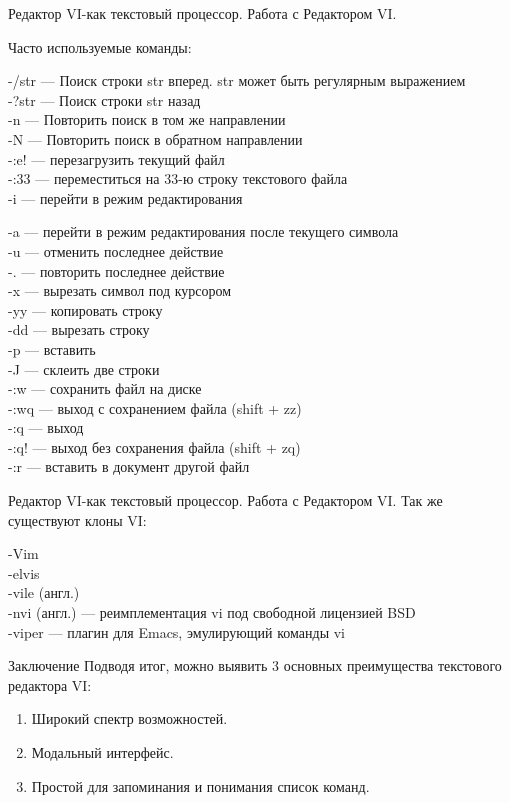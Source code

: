 \documentclass{beamer}
\begin{document}
\begin{frame}{Редактор VI-как текстовый процессор. Работа с Редактором VI.}

Часто используемые команды:

-/str — Поиск строки str вперед. str может быть регулярным выражением
\\
-?str — Поиск строки str назад
\\
-n — Повторить поиск в том же направлении
\\
-N — Повторить поиск в обратном направлении
\\
-:e! — перезагрузить текущий файл
\\
-:33 — переместиться на 33-ю строку текстового файла
\\
-i — перейти в режим редактирования
\\

\end{frame}
\begin{frame}
-a — перейти в режим редактирования после текущего символа
\\
-u — отменить последнее действие
\\
-. — повторить последнее действие
\\
-x — вырезать символ под курсором
\\
-yy — копировать строку
\\
-dd — вырезать строку
\\
-p — вставить
\\
-J — склеить две строки
\\
-:w — сохранить файл на диске
\\
-:wq — выход с сохранением файла (shift + zz)
\\
-:q — выход
\\
-:q! — выход без сохранения файла (shift + zq)
\\
-:r — вставить в документ другой файл



\end{frame}

\begin{frame}{{Редактор VI-как текстовый процессор. Работа с Редактором VI.}}
Так же существуют клоны VI:
\newline


-Vim
\\
-elvis
\\
-vile (англ.)
\\
-nvi (англ.) — реимплементация vi под свободной лицензией BSD
\\
-viper — плагин для Emacs, эмулирующий команды vi

\end{frame}

\begin{frame}{Заключение}
Подводя итог, можно выявить 3 основных преимущества текстового редактора VI:
\newline


\begin{enumerate}
\item Широкий спектр возможностей.
\item Модальный интерфейс.
\item Простой для запоминания и понимания список команд.
\end{enumerate}
\end{frame}
\end{document}
